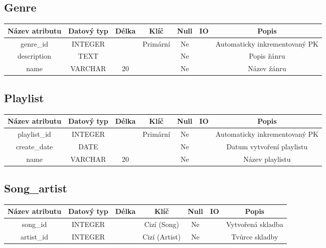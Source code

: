 \subsection*{Genre}
\begin{tabular}{ |c|c c c c c|c| }
    \hline
    \textbf{Název atributu} & \textbf{Datový typ} & \textbf{Délka} & \textbf{Klíč} & \textbf{Null} & \textbf{IO} & \textbf{Popis}                         \\
    \hline
    genre\_id               & INTEGER             &                & Primární      & Ne            &             & Automaticky inkrementovaný PK \\
    description             & TEXT                &                &               & Ne            &             & Popis žánru                   \\
    name                    & VARCHAR             & 20             &               & Ne            &             & Název žánru                   \\
    \hline
\end{tabular}
\bigskip

\subsection*{Playlist}
\begin{tabular}{ |c|c c c c c|c| }
    \hline
    \textbf{Název atributu} & \textbf{Datový typ} & \textbf{Délka} & \textbf{Klíč} & \textbf{Null} & \textbf{IO} & \textbf{Popis}                         \\
    \hline
    playlist\_id            & INTEGER             &                & Primární      & Ne            &             & Automaticky inkrementovaný PK \\
    create\_date            & DATE                &                &               & Ne            &             & Datum vytvoření playlistu     \\
    name                    & VARCHAR             & 20             &               & Ne            &             & Název playlistu               \\
    \hline
\end{tabular}
\bigskip

\subsection*{Song\_artist}
\begin{tabular}{ |c|c c c c c|c| }
    \hline
    \textbf{Název atributu} & \textbf{Datový typ} & \textbf{Délka} & \textbf{Klíč} & \textbf{Null} & \textbf{IO} & \textbf{Popis}                         \\
    \hline
    song\_id                & INTEGER             &                & Cizí (Song)   & Ne            &             & Vytvořená skladba \\
    artist\_id              & INTEGER             &                & Cizí (Artist) & Ne            &             & Tvůrce skladby    \\
    \hline
\end{tabular}
\bigskip

